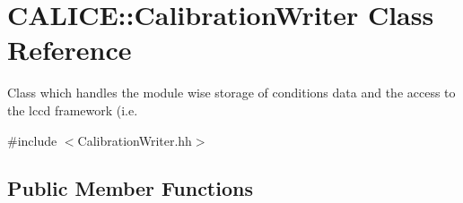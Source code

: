 \section{C\-A\-L\-I\-C\-E\-:\-:Calibration\-Writer Class Reference}
\label{classCALICE_1_1CalibrationWriter}


Class which handles the module wise storage of conditions data and the access to the lccd framework (i.\-e.  




{\ttfamily \#include $<$Calibration\-Writer.\-hh$>$}

\subsection*{Public Member Functions}
